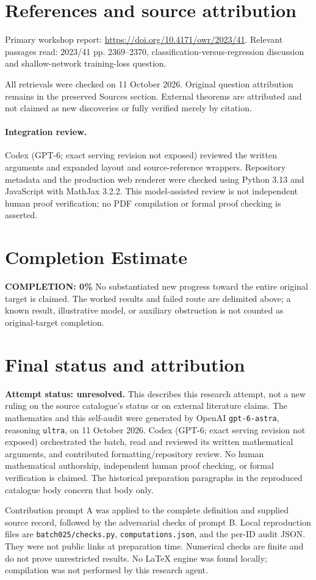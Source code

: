\documentclass[11pt]{article}
\begin{document}
\section{References and source attribution}
Primary workshop report: \url{https://doi.org/10.4171/owr/2023/41}. Relevant passages read: 2023/41 pp. 2369--2370, classification-versus-regression discussion and shallow-network training-loss question.

All retrievals were checked on 11 October 2026. Original question attribution remains in the preserved Sources section. External theorems are attributed and not claimed as new discoveries or fully verified merely by citation.


\paragraph{Integration review.} Codex (GPT-6; exact serving revision not exposed) reviewed the written arguments and expanded layout and source-reference wrappers. Repository metadata and the production web renderer were checked using Python 3.13 and JavaScript with MathJax 3.2.2. This model-assisted review is not independent human proof verification; no PDF compilation or formal proof checking is asserted.

\section{Completion Estimate}
\noindent\textbf{COMPLETION: 0\%}
No substantiated new progress toward the entire original target is claimed. The worked results and failed route are delimited above; a known result, illustrative model, or auxiliary obstruction is not counted as original-target completion.

\section{Final status and attribution}
\textbf{Attempt status: unresolved.} This describes this research attempt, not a new ruling on the source catalogue's status or on external literature claims.
The mathematics and this self-audit were generated by OpenAI \texttt{gpt-6-astra}, reasoning \texttt{ultra}, on 11 October 2026. Codex (GPT-6; exact serving revision not exposed) orchestrated the batch, read and reviewed its written mathematical arguments, and contributed formatting/repository review. No human mathematical authorship, independent human proof checking, or formal verification is claimed. The historical preparation paragraphs in the reproduced catalogue body concern that body only.

Contribution prompt A was applied to the complete definition and supplied source record, followed by the adversarial checks of prompt B. Local reproduction files are \texttt{batch025/checks.py}, \texttt{computations.json}, and the per-ID audit JSON. They were not public links at preparation time. Numerical checks are finite and do not prove unrestricted results. No LaTeX engine was found locally; compilation was not performed by this research agent.
\end{document}
